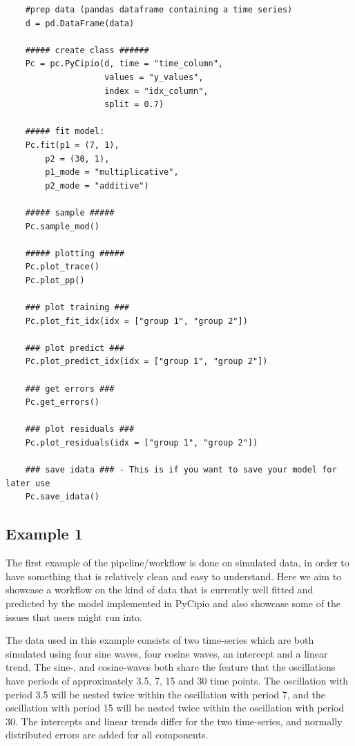 \documentclass{article}
\begin{document}
\begin{lstlisting}
    #prep data (pandas dataframe containing a time series)
    d = pd.DataFrame(data)
    
    ##### create class ######
    Pc = pc.PyCipio(d, time = "time_column", 
                    values = "y_values", 
                    index = "idx_column", 
                    split = 0.7)
    
    ##### fit model: 
    Pc.fit(p1 = (7, 1), 
        p2 = (30, 1), 
        p1_mode = "multiplicative", 
        p2_mode = "additive")
    
    ##### sample #####
    Pc.sample_mod()
    
    ##### plotting #####
    Pc.plot_trace()
    Pc.plot_pp()
    
    ### plot training ###
    Pc.plot_fit_idx(idx = ["group 1", "group 2"])
    
    ### plot predict ###
    Pc.plot_predict_idx(idx = ["group 1", "group 2"])
    
    ### get errors ###
    Pc.get_errors()
    
    ### plot residuals ###
    Pc.plot_residuals(idx = ["group 1", "group 2"])
    
    ### save idata ### - This is if you want to save your model for later use
    Pc.save_idata()
\end{lstlisting}


\subsection{Example 1}

The first example of the pipeline/workflow is done on simulated data, in order to have something that is relatively clean and easy to understand. Here we aim to showcase a workflow on the kind of data that is currently well fitted and predicted by the model implemented in PyCipio and also showcase some of the issues that users might run into. 

The data used in this example consists of two time-series which are both simulated using four sine waves, four cosine waves, an intercept and a linear trend. The sine-, and cosine-waves both share the feature that the oscillations have periods of approximately 3.5, 7, 15 and 30 time points. The oscillation with period 3.5 will be nested twice within the oscillation with period 7, and the oscillation with period 15 will be nested twice within the oscillation with period 30. The intercepts and linear trends differ for the two time-series, and normally distributed errors are added for all components. 
\end{document}
